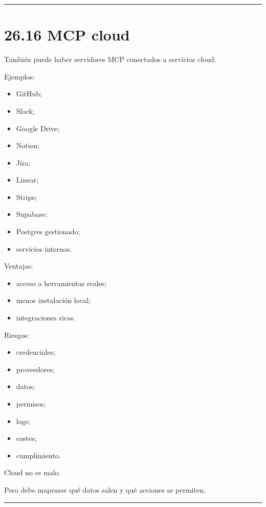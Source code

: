 \begin{center}\rule{0.5\linewidth}{0.5pt}\end{center}

\section{26.16 MCP cloud}\label{mcp-cloud}

También puede haber servidores MCP conectados a servicios cloud.

Ejemplos:

\begin{itemize}
\tightlist
\item
  GitHub;
\item
  Slack;
\item
  Google Drive;
\item
  Notion;
\item
  Jira;
\item
  Linear;
\item
  Stripe;
\item
  Supabase;
\item
  Postgres gestionado;
\item
  servicios internos.
\end{itemize}

Ventajas:

\begin{itemize}
\tightlist
\item
  acceso a herramientas reales;
\item
  menos instalación local;
\item
  integraciones ricas.
\end{itemize}

Riesgos:

\begin{itemize}
\tightlist
\item
  credenciales;
\item
  proveedores;
\item
  datos;
\item
  permisos;
\item
  logs;
\item
  costes;
\item
  cumplimiento.
\end{itemize}

Cloud no es malo.

Pero debe mapearse qué datos salen y qué acciones se permiten.

\begin{center}\rule{0.5\linewidth}{0.5pt}\end{center}

